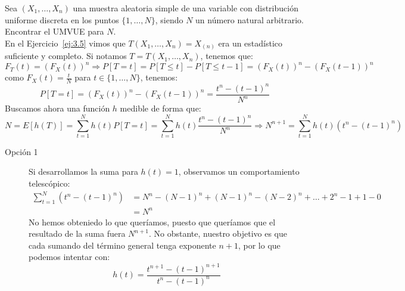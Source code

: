 \begin{ejercicio}
    Sea $(X_1, \ldots, X_n)$ una muestra aleatoria simple de una variable con distribución uniforme discreta en los puntos $\{1,\ldots,N\}$, siendo $N$ un número natural arbitrario. Encontrar el UMVUE para $N$.\\

    \noindent
    En el Ejercicio~\ref{ej:3.5} vimos que $T(X_1, \ldots, X_n) = X_{(n)}$ era un estadístico suficiente y completo. Si notamos $T = T(X_1,\ldots, X_n)$, tenemos que:
    \begin{equation*}
        F_T(t) = {(F_X(t))}^{n} \Longrightarrow P[T=t] = P[T\leq t] - P[T\leq t-1] = {(F_X(t))}^{n}-{(F_X(t-1))}^{n}
    \end{equation*}
    como $F_X(t) = \frac{t}{N}$ para $t\in \{1,\ldots,N\}$, tenemos:
    \begin{equation*}
        P[T=t] = {(F_X(t))}^{n}-{(F_X(t-1))}^{n} = \dfrac{t^n - {(t-1)}^{n}}{N^n}
    \end{equation*} 
    Buscamos ahora una función $h$ medible de forma que:
    \begin{equation*}
        N = E[h(T)] = \sum_{t=1}^{N}h(t) P[T=t] = \sum_{t=1}^{N}h(t)\dfrac{t^n-{(t-1)}^{n}}{N^n}
        \Longrightarrow
        N^{n+1} = \sum_{t=1}^{N}h(t)(t^n-{(t-1)}^{n})
    \end{equation*}

    \begin{description}
        \item[Opción 1] 
        Si desarrollamos la suma para $h(t) = 1$, observamos un comportamiento telescópico:
        \begin{align*}
            \sum_{t=1}^{N}(t^n - {(t-1)}^{n}) &= N^n - {(N-1)}^{n} + {(N-1)}^{n} - {(N-2)}^{n} + \ldots + 2^n - 1 + 1 - 0 \\
                                                            &= N^n
        \end{align*}
        No hemos obteniedo lo que queríamos, puesto que queríamos que el resultado de la suma fuera $N^{n+1}$. No obstante, nuestro objetivo es que cada sumando del término general tenga exponente $n+1$, por lo que podemos intentar con:
        \begin{equation*}
            h(t) = \dfrac{t^{n+1}-{(t-1)}^{n+1}}{t^n - {(t-1)}^{n}}
        \end{equation*} 


\end{description}
\end{ejercicio}
